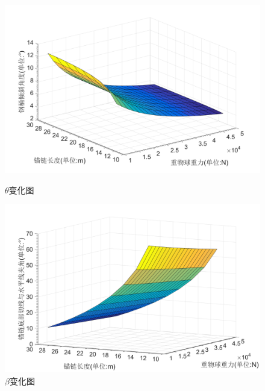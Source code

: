 \documentclass{cumcm}
\begin{document}
\begin{figure}[H]
  \begin{minipage}[t]{0.5\linewidth}   
    \centering   
    \includegraphics[width=\textwidth]{img/II_18_theta.jpg}   
    \caption{$\theta$变化图}   
    \label{fig:2_18_theta}   
  \end{minipage}
   \begin{minipage}[t]{0.5\linewidth} %
      \centering   
      \includegraphics[width=\textwidth]{img/II_18_beta.jpg}   
      \caption{$\beta$变化图}   
      \label{fig:2_18_beta}   
    \end{minipage} 
\end{figure}
\end{document}
